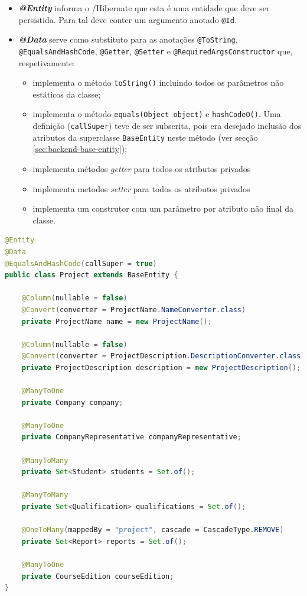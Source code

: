 \begin{itemize}
    \item \textbf{\textit{@Entity}} informa o /\gls{Hibernate} que esta é uma entidade que deve ser persistida. Para tal deve conter um argumento anotado \lstinline|@Id|.
    \item \textbf{\textit{@Data}}\cite{docs-annotation-data} serve como substituto para as anotações \lstinline|@ToString|, \lstinline|@EqualsAndHashCode|, \lstinline|@Getter|, \lstinline|@Setter| e \lstinline|@RequiredArgsConstructor| que, respetivamente: 
    
    \begin{itemize}
        \item implementa o método \lstinline|toString()| incluindo todos os parâmetros não estáticos da classe;
        \item implementa o método \lstinline|equals(Object object)| e \lstinline|hashCodeO()|. Uma definição (\lstinline|callSuper|) teve de ser subscrita, pois era desejado inclusão dos atributos da superclasse \lstinline|BaseEntity| neste método (ver secção \ref{sec:backend-base-entity});
        \item implementa métodos \textit{getter} para todos os atributos privados
        \item implementa metodos \textit{setter} para todos os atributos privados
        \item implementa um construtor com um parâmetro por atributo não final da classe.
    \end{itemize}

\end{itemize}

\begin{lstlisting}[language=Java, caption={Classe \textit{Project}}, label={lst:class-project}]
@Entity
@Data
@EqualsAndHashCode(callSuper = true)
public class Project extends BaseEntity {

    @Column(nullable = false)
    @Convert(converter = ProjectName.NameConverter.class)
    private ProjectName name = new ProjectName();

    @Column(nullable = false)
    @Convert(converter = ProjectDescription.DescriptionConverter.class)
    private ProjectDescription description = new ProjectDescription();

    @ManyToOne
    private Company company;

    @ManyToOne
    private CompanyRepresentative companyRepresentative;

    @ManyToMany
    private Set<Student> students = Set.of();

    @ManyToMany
    private Set<Qualification> qualifications = Set.of();

    @OneToMany(mappedBy = "project", cascade = CascadeType.REMOVE)
    private Set<Report> reports = Set.of();

    @ManyToOne
    private CourseEdition courseEdition;
}
\end{lstlisting}













